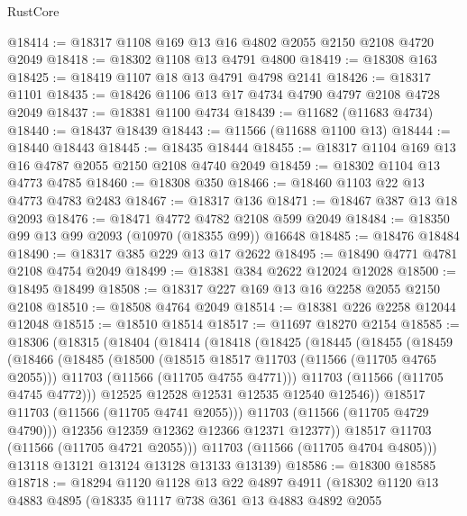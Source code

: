 \begin{lexlean}{RustCore}
\begin{coremodule}
@18414 := @18317 @1108 @169 @13 @16 @4802 @2055 @2150 @2108 @4720 @2049
@18418 := @18302 @1108 @13 @4791 @4800
@18419 := @18308 @163
@18425 := @18419 @1107 @18 @13 @4791 @4798 @2141
@18426 := @18317 @1101
@18435 := @18426 @1106 @13 @17 @4734 @4790 @4797 @2108 @4728 @2049
@18437 := @18381 @1100 @4734
@18439 := @11682 (@11683 @4734)
@18440 := @18437 @18439
@18443 := @11566 (@11688 @1100 @13)
@18444 := @18440 @18443
@18445 := @18435 @18444
@18455 := @18317 @1104 @169 @13 @16 @4787 @2055 @2150 @2108 @4740 @2049
@18459 := @18302 @1104 @13 @4773 @4785
@18460 := @18308 @350
@18466 := @18460 @1103 @22 @13 @4773 @4783 @2483
@18467 := @18317 @136
@18471 := @18467 @387 @13 @18 @2093
@18476 := @18471 @4772 @4782 @2108 @599 @2049
@18484 := @18350 @99 @13 @99 @2093 (@10970 (@18355 @99)) @16648
@18485 := @18476 @18484
@18490 := @18317 @385 @229 @13 @17 @2622
@18495 := @18490 @4771 @4781 @2108 @4754 @2049
@18499 := @18381 @384 @2622 @12024 @12028
@18500 := @18495 @18499
@18508 := @18317 @227 @169 @13 @16 @2258 @2055 @2150 @2108
@18510 := @18508 @4764 @2049
@18514 := @18381 @226 @2258 @12044 @12048
@18515 := @18510 @18514
@18517 := @11697 @18270 @2154
@18585 := @18306
    (@18315
      (@18404
        (@18414
          (@18418
            (@18425
              (@18445
                (@18455
                  (@18459
                    (@18466
                      (@18485
                        (@18500
                          (@18515 @18517 @11703 (@11566 (@11705 @4765 @2055)))
                          @11703
                          (@11566 (@11705 @4755 @4771)))
                        @11703
                        (@11566 (@11705 @4745 @4772)))
                      @12525
                      @12528
                      @12531
                      @12535
                      @12540
                      @12546))
                  @18517
                  @11703
                  (@11566 (@11705 @4741 @2055)))
                @11703
                (@11566 (@11705 @4729 @4790)))
              @12356
              @12359
              @12362
              @12366
              @12371
              @12377))
          @18517
          @11703
          (@11566 (@11705 @4721 @2055)))
        @11703
        (@11566 (@11705 @4704 @4805)))
      @13118
      @13121
      @13124
      @13128
      @13133
      @13139)
@18586 := @18300 @18585
@18718 := @18294
    @1120
    @1128
    @13
    @22
    @4897
    @4911
    (@18302
      @1120
      @13
      @4883
      @4895
      (@18335
        @1117
        @738
        @361
        @13
        @4883
        @4892
        @2055

\end{coremodule}
\end{lexlean}
